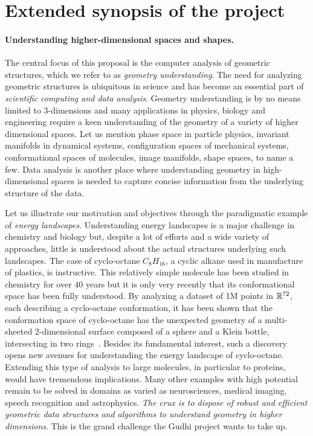 \section{Extended synopsis of the project}

\paragraph{Understanding higher-dimensional spaces and shapes.} 
The central focus of this proposal is  the computer %
analysis of geometric structures, which we refer to as {\em geometry understanding}.  The need for analyzing geometric structures is ubiquitous in science and has become an essential part of {\em scientific computing and data analysis}. Geometry understanding is by no means limited to 3-dimensions and many applications in physics, biology and engineering require a keen understanding of the geometry of a variety of higher dimensional spaces. Let us mention phase space in particle physics, invariant manifolds in dynamical systems, configuration spaces of mechanical systems, conformational spaces of molecules, image manifolds, shape spaces, to name a few. Data analysis  is another place where understanding
geometry in high-dimensional spaces is needed to
capture concise information from the underlying structure of the data. 

Let us illustrate our motivation and objectives through the paradigmatic example of {\em energy landscapes}. Understanding  energy landscapes is a major challenge in chemistry and biology but,  despite a lot of efforts and a wide variety of approaches, little is understood about the actual structures underlying such landscapes. The case of cyclo-octane $C_8H_{16}$, a cyclic alkane used in manufacture of plastics, is instructive. This relatively simple molecule has been studied in chemistry for over 40 years but it is only very recently that its conformational space has been fully understood. By analyzing a dataset of 1M points in $\mathbb R^{72}$, each describing a cyclo-octane conformation, it has been shown that the conformation space of cyclo-octane has the unexpected geometry of  a multi-sheeted 2-dimensional surface composed of a sphere and a Klein bottle, intersecting in two rings~\cite{mtcw-tco-2010}.  Besides its fundamental interest, such a discovery opens new avenues for understanding the energy landscape of cyclo-octane. Extending this type of analysis to large molecules, in particular to proteins, would have tremendous implications. Many other examples with high potential remain to be solved in domains as varied as neurosciences, medical imaging, speech recognition and astrophysics. {\em The crux is to dispose of robust and efficient geometric data structures and algorithms to understand geometry in higher dimensions}. This is the grand challenge the Gudhi project wants to take up.


